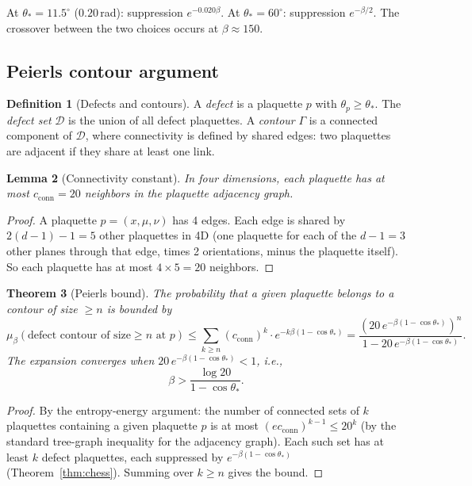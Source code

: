 \documentclass[11pt]{article}
\newtheorem{theorem}{Theorem}[section]
\newtheorem{lemma}[theorem]{Lemma}
\theoremstyle{definition}
\newtheorem{definition}[theorem]{Definition}
\begin{document}
At $\theta_*=11.5^\circ$ ($0.20$\,rad): suppression
$e^{-0.020\beta}$.  At $\theta_*=60^\circ$: suppression $e^{-\beta/2}$.
The crossover between the two choices occurs at $\beta\approx 150$.

\subsection{Peierls contour argument}\label{subsec:peierls}

\begin{definition}[Defects and contours]\label{def:contour}
A \emph{defect} is a plaquette $p$ with $\theta_p\ge\theta_*$.  The
\emph{defect set} $\mathcal{D}$ is the union of all defect plaquettes.
A \emph{contour} $\Gamma$ is a connected component of $\mathcal{D}$,
where connectivity is defined by shared edges: two plaquettes are
adjacent if they share at least one link.
\end{definition}

\begin{lemma}[Connectivity constant]\label{lem:conn}
In four dimensions, each plaquette has at most $c_{\mathrm{conn}}=20$
neighbors in the plaquette adjacency graph.
\end{lemma}

\begin{proof}
A plaquette $p=(x,\mu,\nu)$ has 4 edges.  Each edge is shared by
$2(d-1)-1=5$ other plaquettes in 4D (one plaquette for each of the
$d-1=3$ other planes through that edge, times 2 orientations, minus
the plaquette itself).  So each plaquette has at most $4\times 5=20$
neighbors.
\end{proof}

\begin{theorem}[Peierls bound]\label{thm:peierls}
The probability that a given plaquette belongs to a contour of size
$\ge n$ is bounded by
\begin{equation}
\mu_\beta(\text{defect contour of size}\ge n\text{ at }p)
\le\sum_{k\ge n}(c_{\mathrm{conn}})^k\cdot
e^{-k\beta(1-\cos\theta_*)}
=\frac{(20\,e^{-\beta(1-\cos\theta_*)})^n}
{1-20\,e^{-\beta(1-\cos\theta_*)}}.
\end{equation}
The expansion converges when
$20\,e^{-\beta(1-\cos\theta_*)}<1$, i.e.,
\begin{equation}
\beta>\frac{\log 20}{1-\cos\theta_*}.
\end{equation}
\end{theorem}

\begin{proof}
By the entropy-energy argument: the number of connected sets of $k$
plaquettes containing a given plaquette $p$ is at most
$(ec_{\mathrm{conn}})^{k-1}\le 20^k$ (by the standard tree-graph
inequality for the adjacency graph).  Each such set has at least $k$
defect plaquettes, each suppressed by $e^{-\beta(1-\cos\theta_*)}$
(Theorem~\ref{thm:chess}).  Summing over $k\ge n$ gives the bound.
\end{proof}
\end{document}
